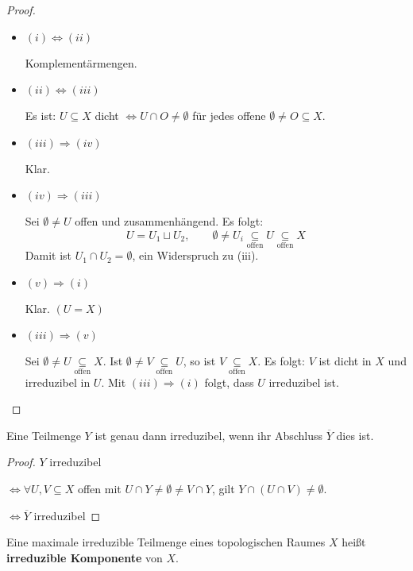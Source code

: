 \begin{proof}
  \mbox{}
  \begin{itemize}
  \item $(i)\Leftrightarrow(ii)$

    Komplementärmengen.
  \item $(ii)\Leftrightarrow(iii)$ 

    Es ist: $U\subseteq X$ dicht $\Leftrightarrow U\cap O\neq\emptyset$
    für jedes offene $\emptyset\neq O\subseteq X$.
  \item $(iii)\Rightarrow(iv)$

    Klar. 
  \item $(iv)\Rightarrow(iii)$

    Sei $\emptyset\neq U$ offen und zusammenhängend. Es folgt:
    \[
      U=U_{1}\sqcup U_{2},\qquad\emptyset\neq U_{i}\underset{\text{offen}}{\subseteq}U\underset{\text{offen}}{\subseteq}X
    \]
    Damit ist $U_{1}\cap U_{2}=\emptyset$, ein Widerspruch zu (iii).
  \item $(v)\Rightarrow(i)$ 

    Klar. $(U=X)$
  \item $(iii)\Rightarrow(v)$

    Sei $\emptyset\neq U\underset{\text{offen}}{\subseteq}X$. Ist $\emptyset\neq V\underset{\text{offen}}{\subseteq}U$,
    so ist $V\underset{\text{offen}}{\subseteq}X$. Es folgt: $V$ ist
    dicht in $X$ und irreduzibel in $U$. Mit $(iii)\Rightarrow(i)$
    folgt, dass $U$ irreduzibel ist. 

  \end{itemize}
\end{proof}
\begin{lem}
  \label{lem:irreduzibel-abschluss}
  Eine Teilmenge $Y$ ist genau dann irreduzibel, wenn ihr Abschluss $\overline{Y}$ dies ist.
\end{lem}
\begin{proof}
  $Y$ irreduzibel

  $\Leftrightarrow\forall U,V\subseteq X$ offen mit $U\cap Y\neq\emptyset\neq V\cap Y$,
  gilt $Y\cap(U\cap V)\neq\emptyset$.

  $\Leftrightarrow\overline{Y}$ irreduzibel 
\end{proof}
\begin{defn}
  \label{def:irreduzible-komponente}
  Eine maximale irreduzible Teilmenge eines topologischen Raumes $X$
  heißt \textbf{irreduzible Komponente}
  von $X$.
\end{defn}
